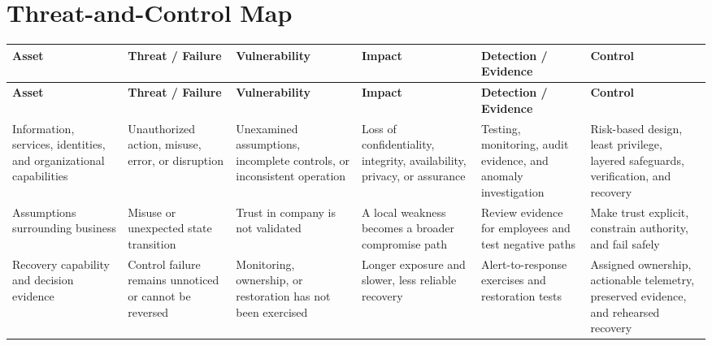 \documentclass[11pt]{article}
\begin{document}
\section*{Threat-and-Control Map}
\begingroup\scriptsize\setlength{\tabcolsep}{2pt}
\begin{longtable}{>{\RaggedRight\arraybackslash}p{}>{\RaggedRight\arraybackslash}p{}>{\RaggedRight\arraybackslash}p{}>{\RaggedRight\arraybackslash}p{}>{\RaggedRight\arraybackslash}p{}>{\RaggedRight\arraybackslash}p{}}
\toprule\rowcolor{Navy}\color{white}\textbf{Asset} & \color{white}\textbf{Threat / Failure} & \color{white}\textbf{Vulnerability} & \color{white}\textbf{Impact} & \color{white}\textbf{Detection / Evidence} & \color{white}\textbf{Control}\\\midrule
\endfirsthead
\toprule\rowcolor{Navy}\color{white}\textbf{Asset} & \color{white}\textbf{Threat / Failure} & \color{white}\textbf{Vulnerability} & \color{white}\textbf{Impact} & \color{white}\textbf{Detection / Evidence} & \color{white}\textbf{Control}\\\midrule
\endhead
Information, services, identities, and organizational capabilities & Unauthorized action, misuse, error, or disruption & Unexamined assumptions, incomplete controls, or inconsistent operation & Loss of confidentiality, integrity, availability, privacy, or assurance & Testing, monitoring, audit evidence, and anomaly investigation & Risk-based design, least privilege, layered safeguards, verification, and recovery\\\midrule
Assumptions surrounding business & Misuse or unexpected state transition & Trust in company is not validated & A local weakness becomes a broader compromise path & Review evidence for employees and test negative paths & Make trust explicit, constrain authority, and fail safely\\\midrule
Recovery capability and decision evidence & Control failure remains unnoticed or cannot be reversed & Monitoring, ownership, or restoration has not been exercised & Longer exposure and slower, less reliable recovery & Alert-to-response exercises and restoration tests & Assigned ownership, actionable telemetry, preserved evidence, and rehearsed recovery\\\midrule
\bottomrule
\end{longtable}
\endgroup
\end{document}
